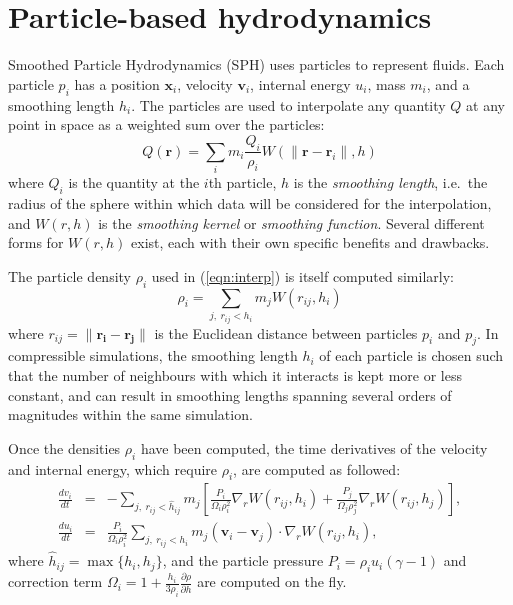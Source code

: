 \documentclass{sig-alternate-05-2015}
\newcommand{\eqn}[1] {(\ref{eqn:#1})}
\begin{document}
\section{Particle-based hydrodynamics}

Smoothed Particle Hydrodynamics \cite{Gingold1977,Price2012} (SPH) uses
particles to represent fluids.  Each particle $p_i$ has a position $\mathbf
x_i$, velocity $\mathbf v_i$, internal energy $u_i$, mass $m_i$, and a smoothing
length $h_i$.  The particles are used to interpolate any quantity $Q$ at any
point in space as a weighted sum over the particles:
%
\begin{equation}
    Q(\mathbf r) = \sum_i m_i \frac{Q_i}{\rho_i} W( \|\mathbf r - \mathbf r_i\| , h )
    \label{eqn:interp}
\end{equation}
%
where $Q_i$ is the quantity at the $i$th particle, $h$ is the {\em smoothing
  length}, i.e.~the radius of the sphere within which data will be considered
for the interpolation, and $W(r,h)$ is the {\em smoothing kernel} or {\em
  smoothing function}.  Several different forms for $W(r,h)$ exist, each with
their own specific benefits and drawbacks.

The particle density $\rho_i$ used in \eqn{interp} is itself computed similarly:
%
\begin{equation}
    \rho_i = \sum_{j,~r_{ij} < h_i} m_j W(r_{ij},h_i)
    \label{eqn:rho}
\end{equation}
%
where $r_{ij} = \|\mathbf{r_i}-\mathbf{r_j}\|$ is the Euclidean distance between
particles $p_i$ and $p_j$.  In compressible simulations, the smoothing length
$h_i$ of each particle is chosen such that the number of neighbours with which
it interacts is kept more or less constant, and can result in smoothing lengths
spanning several orders of magnitudes within the same simulation.

Once the densities $\rho_i$ have been computed, the time derivatives of the
velocity and internal energy, which require $\rho_i$, are
computed as followed:
%
\begin{eqnarray}
    \frac{dv_i}{dt} & = & -\sum_{j,~r_{ij} < \hat{h}_{ij}} m_j \left[
        \frac{P_i}{\Omega_i\rho_i^2}\nabla_rW(r_{ij},h_i) +
        \frac{P_j}{\Omega_j\rho_j^2}\nabla_rW(r_{ij},h_j) \right], \label{eqn:dvdt} \\ 
    \frac{du_i}{dt} & = & \frac{P_i}{\Omega_i\rho_i^2} \sum_{j,~r_{ij} < h_i} m_j(\mathbf v_i - \mathbf v_j) \cdot \nabla_rW(r_{ij},h_i), \label{eqn:dudt}
\end{eqnarray}
%
where $\hat{h}_{ij} = \max\{h_i,h_j\}$, and the particle pressure $P_i=\rho_i
u_i (\gamma-1)$ and correction term $\Omega_i=1 +
\frac{h_i}{3\rho_i}\frac{\partial \rho}{\partial h}$ are computed on the fly.
\end{document}

